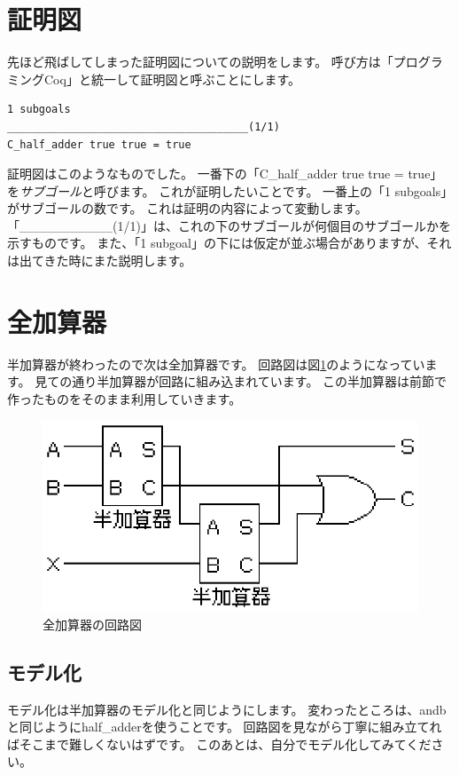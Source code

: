 \documentclass{jsbook}
\begin{document}
\section{証明図}
先ほど飛ばしてしまった証明図についての説明をします。
呼び方は「プログラミングCoq」と統一して証明図と呼ぶことにします。
\begin{verbatim}
1 subgoals
______________________________________(1/1)
C_half_adder true true = true
\end{verbatim}
証明図はこのようなものでした。
一番下の「C\_half\_adder true true = true」を\emph{サブゴール}と呼びます。
これが証明したいことです。
一番上の「1 subgoals」がサブゴールの数です。
これは証明の内容によって変動します。
「\_\_\_\_\_\_\_\_\_\_(1/1)」は、これの下のサブゴールが何個目のサブゴールかを示すものです。
また、「1 subgoal」の下には仮定が並ぶ場合がありますが、それは出てきた時にまた説明します。

\section{全加算器}
半加算器が終わったので次は全加算器です。
回路図は図\ref{full_adder}のようになっています。
見ての通り半加算器が回路に組み込まれています。
この半加算器は前節で作ったものをそのまま利用していきます。
\begin{figure}[htbp]
\begin{center}
  \includegraphics[scale=1.0]{image/full_adder.eps}
  \caption{全加算器の回路図}
  \label{full_adder}
\end{center}
\end{figure}
\subsection*{モデル化}
モデル化は半加算器のモデル化と同じようにします。
変わったところは、andbと同じようにhalf\_adderを使うことです。
回路図を見ながら丁寧に組み立てればそこまで難しくないはずです。
このあとは、自分でモデル化してみてください。
\end{document}
